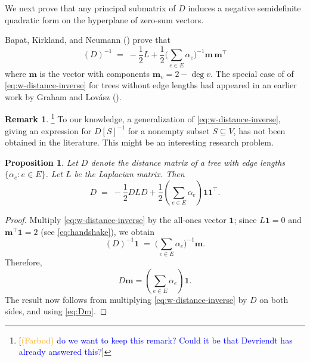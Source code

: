\documentclass[12pt]{amsart}
\newtheorem{prop}[thm]{Proposition}
\theoremstyle{definition}
\newtheorem{rmk}[thm]{Remark}
\newcommand{\bone}{\mathbf{1}}
\newcommand{\boldm}{\mathbf{m}}
\newcommand{\Da}{{D}}
\newcommand{\La}{L}
\newcommand{\tr}{\intercal}
\newcommand\farbod[1]{\footnote{[\textcolor{orange}{(Farbod)} \textcolor{blue}{#1}]}}
\begin{document}
We next prove that any principal submatrix of $D$ induces a negative semidefinite quadratic form on the hyperplane of zero-sum vectors.

Bapat, Kirkland, and Neumann (\cite[Theorem 2.1]{bapat-kirkland-neumann}) prove that
\begin{equation}
\label{eq:w-distance-inverse}
	(\Da)^{-1} \;=\; - \frac12 \La + \frac12 \Big( \sum_{e \in E} \alpha_e\Big)^{-1} \boldm\, \boldm^\tr
\end{equation}
where $\boldm$ is the vector with components $\boldm_v = 2 - \deg v$.
The special case of of \eqref{eq:w-distance-inverse} for trees without edge lengths had appeared in an earlier work by Graham and Lov\'asz (\cite[Lemma 1]{graham-lovasz}).
\begin{rmk}
\farbod{do we want to keep this remark? Could it be that Devriendt has already answered this?}
To our knowledge, a generalization of \eqref{eq:w-distance-inverse}, giving an expression for $D[S]^{-1}$ for a nonempty subset $S \subseteq V$, has not been obtained in the literature. This might be an interesting research problem.
\end{rmk}
\begin{prop}
\label{prop:dist-laplacian}
Let $D$ denote the distance matrix of a tree with edge lengths $\{\alpha_e \colon e \in E\}$. Let $\La$ be the Laplacian matrix. 
Then
\[
	\Da \;=\; - \frac{1}{2} \Da \La \Da + \frac{1}{2} \left( \sum_{e \in E} \alpha_e\right) \bone \bone^\tr .
\]
\end{prop}
\begin{proof}
Multiply \eqref{eq:w-distance-inverse} by the all-ones vector $\bone$; since $\La \bone = 0$ and $\boldm^\tr \bone = 2$ (see \eqref{eq:handshake}), we obtain 
\[
(\Da)^{-1} \bone \;=\; \Big( \sum_{e \in E} \alpha_e\Big)^{-1} \boldm .
\]
Therefore, 
\begin{equation}\label{eq:Dm}
\Da \boldm = \left( \sum_{e \in E} \alpha_e \right) \bone .
\end{equation}
The result now follows from multiplying \eqref{eq:w-distance-inverse} by $\Da$ on both sides, and using \eqref{eq:Dm}. 
\end{proof}
\end{document}
